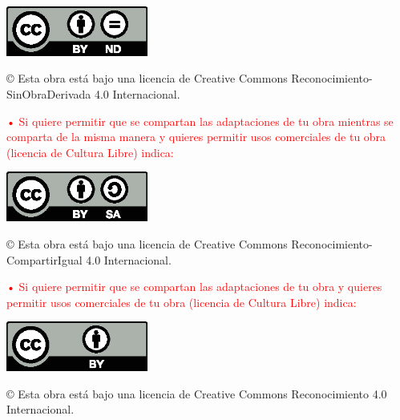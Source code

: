 \documentclass[a4paper,12pt,oneside]{scrbook}
\begin{document}
\begin{center}
\includegraphics[width=4.66cm]{images/licenses/by-nd}
\end{center}

\begin{large}
© Esta obra está bajo una licencia de Creative Commons Reconocimiento-SinObraDerivada 4.0 Internacional.
\end{large}

\bigskip
\bigskip
\bigskip
\textcolor{red}{• Si quiere permitir que se compartan las adaptaciones de tu obra mientras se comparta de la misma manera y quieres permitir usos comerciales de tu obra (licencia de Cultura Libre) indica:}

\begin{center}
\includegraphics[width=4.66cm]{images/licenses/by-sa}
\end{center}

\begin{large}
© Esta obra está bajo una licencia de Creative Commons Reconocimiento-CompartirIgual 4.0 Internacional.
\end{large}

\bigskip
\bigskip
\bigskip
\textcolor{red}{• Si quiere permitir que se compartan las adaptaciones de tu obra y quieres permitir usos comerciales de tu obra (licencia de Cultura Libre) indica:}

\begin{center}
\includegraphics[width=4.66cm]{images/licenses/by}
\end{center}

\begin{large}
© Esta obra está bajo una licencia de Creative Commons Reconocimiento 4.0 Internacional.
\end{large}
\end{document}
